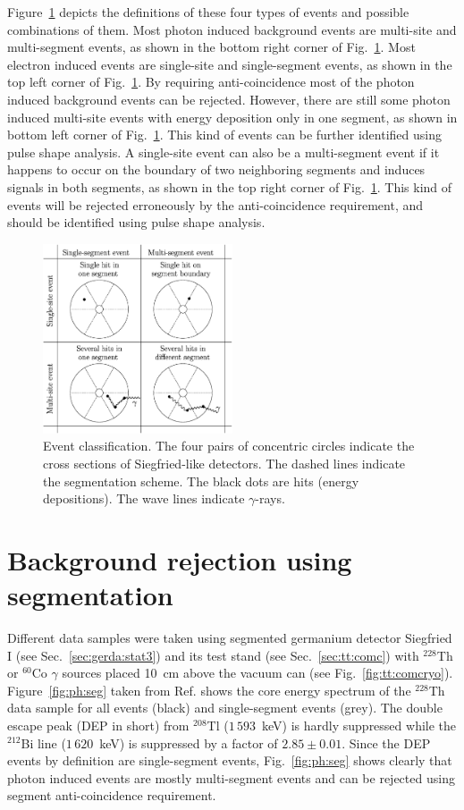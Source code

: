 Figure~\ref{fig:ph:eve} depicts the definitions of these four types of events and possible combinations of them. Most photon induced background events are multi-site and multi-segment events, as shown in the bottom right corner of Fig.~\ref{fig:ph:eve}. Most electron induced events are single-site and single-segment events, as shown in the top left corner of Fig.~\ref{fig:ph:eve}. By requiring anti-coincidence most of the photon induced background events can be rejected. However, there are still some photon induced multi-site events with energy deposition only in one segment, as shown in bottom left corner of Fig.~\ref{fig:ph:eve}. This kind of events can be further identified using pulse shape analysis. A single-site event can also be a multi-segment event if it happens to occur on the boundary of two neighboring segments and induces signals in both segments, as shown in the top right corner of Fig.~\ref{fig:ph:eve}. This kind of events will be rejected erroneously by the anti-coincidence requirement, and should be identified using pulse shape analysis.

\begin{figure}
\centering
\includegraphics[width=0.5\textwidth]{events}
\caption{Event classification. The four pairs of concentric circles indicate the cross sections of Siegfried-like detectors. The dashed lines indicate the segmentation scheme. The black dots are hits (energy depositions). The wave lines indicate $\gamma$-rays.}
\label{fig:ph:eve}
\end{figure}

\section{Background rejection using segmentation}
\label{sec:ph:seg}
Different data samples were taken using segmented germanium detector Siegfried I (see Sec.~\ref{sec:gerda:stat3}) and its test stand (see Sec.~\ref{sec:tt:comc}) with $^{228}$Th or $^{60}$Co $\gamma$ sources placed 10~cm above the vacuum can (see Fig.~\ref{fig:tt:comcryo}). Figure~\ref{fig:ph:seg} taken from Ref.\cite{Pid07} shows the core energy spectrum of the $^{228}$Th data sample for all events (black) and single-segment events (grey). The double escape peak (DEP in short) from $^{208}$Tl ($1\,593$~keV) is hardly suppressed while the $^{212}$Bi line ($1\,620$~keV) is suppressed by a factor of $2.85 \pm 0.01$. Since the DEP events by definition are single-segment events, Fig.~\ref{fig:ph:seg} shows clearly that photon induced events are mostly multi-segment events and can be rejected using segment anti-coincidence requirement.

